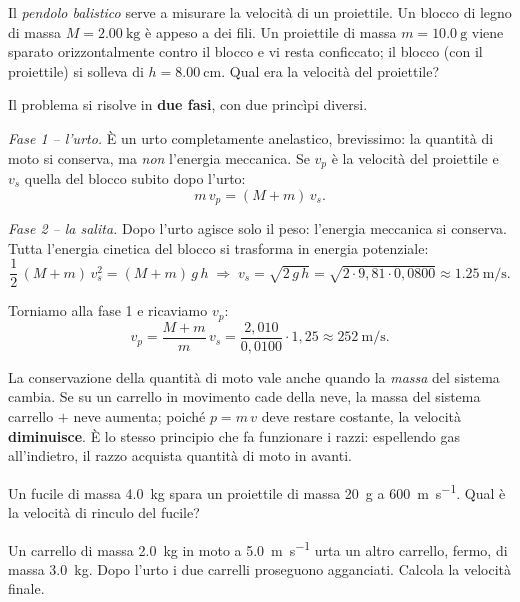 \begin{testexample}
Il \emph{pendolo balistico} serve a misurare la velocità di un proiettile. Un blocco di legno di massa $M = \SI{2,00}{\kilo\gram}$ è appeso a dei fili. Un proiettile di massa $m = \SI{10,0}{\gram}$ viene sparato orizzontalmente contro il blocco e vi resta conficcato; il blocco (con il proiettile) si solleva di $h = \SI{8,00}{\centi\metre}$. Qual era la velocità del proiettile?

Il problema si risolve in \textbf{due fasi}, con due princìpi diversi.

\emph{Fase 1 -- l'urto.} È un urto completamente anelastico, brevissimo: la quantità di moto si conserva, ma \emph{non} l'energia meccanica. Se $v_p$ è la velocità del proiettile e $v_s$ quella del blocco subito dopo l'urto:
\[ m\,v_p = (M + m)\,v_s. \]

\emph{Fase 2 -- la salita.} Dopo l'urto agisce solo il peso: l'energia meccanica si conserva. Tutta l'energia cinetica del blocco si trasforma in energia potenziale:
\[ \frac12\,(M + m)\,v_s^2 = (M + m)\,g\,h \;\Longrightarrow\; v_s = \sqrt{2\,g\,h} = \sqrt{2 \cdot 9{,}81 \cdot 0{,}0800} \approx \SI{1,25}{\metre\per\second}. \]

Torniamo alla fase 1 e ricaviamo $v_p$:
\[ v_p = \frac{M + m}{m}\,v_s = \frac{2{,}010}{0{,}0100} \cdot 1{,}25 \approx \SI{252}{\metre\per\second}. \]
\end{testexample}

\begin{remark}
La conservazione della quantità di moto vale anche quando la \emph{massa} del sistema cambia. Se su un carrello in movimento cade della neve, la massa del sistema carrello $+$ neve aumenta; poiché $p = m\,v$ deve restare costante, la velocità \textbf{diminuisce}. È lo stesso principio che fa funzionare i razzi: espellendo gas all'indietro, il razzo acquista quantità di moto in avanti.
\end{remark}

\begin{esercizio}
Un fucile di massa \SI{4,0}{\kilo\gram} spara un proiettile di massa \SI{20}{\gram} a \SI{600}{\metre\per\second}. Qual è la velocità di rinculo del fucile?\\
\end{esercizio}

\begin{esercizio}
Un carrello di massa \SI{2,0}{\kilo\gram} in moto a \SI{5,0}{\metre\per\second} urta un altro carrello, fermo, di massa \SI{3,0}{\kilo\gram}. Dopo l'urto i due carrelli proseguono agganciati. Calcola la velocità finale.\\
\end{esercizio}

